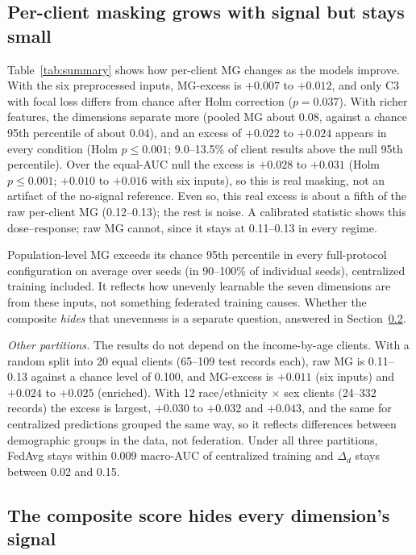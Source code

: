 \subsection{Per-client masking grows with signal but stays small}

Table~\ref{tab:summary} shows how per-client MG changes as the models improve. With the six preprocessed inputs, MG-excess is $+0.007$ to $+0.012$, and only C3 with focal loss differs from chance after Holm correction ($p=0.037$). With richer features, the dimensions separate more (pooled MG about 0.08, against a chance 95th percentile of about 0.04), and an excess of $+0.022$ to $+0.024$ appears in every condition (Holm $p \leq 0.001$; 9.0--13.5\% of client results above the null 95th percentile). Over the equal-AUC null the excess is $+0.028$ to $+0.031$ (Holm $p \leq 0.001$; $+0.010$ to $+0.016$ with six inputs), so this is real masking, not an artifact of the no-signal reference. Even so, this real excess is about a fifth of the raw per-client MG (0.12--0.13); the rest is noise. A calibrated statistic shows this dose--response; raw MG cannot, since it stays at 0.11--0.13 in every regime.

Population-level MG exceeds its chance 95th percentile in every full-protocol configuration on average over seeds (in 90--100\% of individual seeds), centralized training included. It reflects how unevenly learnable the seven dimensions are from these inputs, not something federated training causes. Whether the composite \emph{hides} that unevenness is a separate question, answered in Section~\ref{sec:blind}.

\emph{Other partitions.} The results do not depend on the income-by-age clients. With a random split into 20 equal clients (65--109 test records each), raw MG is 0.11--0.13 against a chance level of 0.100, and MG-excess is $+0.011$ (six inputs) and $+0.024$ to $+0.025$ (enriched). With 12 race/ethnicity $\times$ sex clients (24--332 records) the excess is largest, $+0.030$ to $+0.032$ and $+0.043$, and the same for centralized predictions grouped the same way, so it reflects differences between demographic groups in the data, not federation. Under all three partitions, FedAvg stays within 0.009 macro-AUC of centralized training and $\Delta_d$ stays between 0.02 and 0.15.

\subsection{The composite score hides every dimension's signal}\label{sec:blind}

